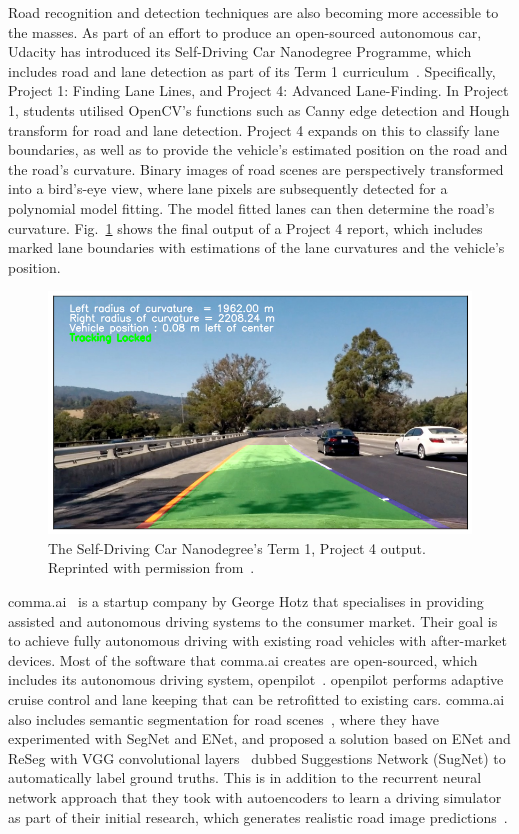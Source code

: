 Road recognition and detection techniques are also becoming more accessible to the masses. As part of an effort to produce an open-sourced autonomous car, Udacity has introduced its Self-Driving Car Nanodegree Programme, which includes road and lane detection as part of its Term 1 curriculum~\cite{udacity_self-driving_2017}. Specifically, Project 1: Finding Lane Lines, and Project 4: Advanced Lane-Finding. In Project 1, students utilised OpenCV's functions such as Canny edge detection and Hough transform for road and lane detection. Project 4 expands on this to classify lane boundaries, as well as to provide the vehicle's estimated position on the road and the road's curvature. Binary images of road scenes are perspectively transformed into a bird's-eye view, where lane pixels are subsequently detected for a polynomial model fitting. The model fitted lanes can then determine the road's curvature. Fig.~\ref{figudacity} shows the final output of a Project 4 report, which includes marked lane boundaries with estimations of the lane curvatures and the vehicle's position.

\begin{figure}[H]
	\centering
	\includegraphics[width=0.7\linewidth]{udacity}
	\caption[Self-Driving Car Nanodegree output]{The Self-Driving Car Nanodegree's Term 1, Project 4 output. Reprinted with permission from~\cite{anthony_github_2017}.}
	\label{figudacity}
\end{figure}

comma.ai~\cite{comma._ai_comma.ai_2017} is a startup company by George Hotz that specialises in providing assisted and autonomous driving systems to the consumer market. Their goal is to achieve fully autonomous driving with existing road vehicles with after-market devices. Most of the software that comma.ai creates are open-sourced, which includes its autonomous driving system, openpilot~\cite{comma._ai_openpilot_2017}. openpilot performs adaptive cruise control and lane keeping that can be retrofitted to existing cars. comma.ai also includes semantic segmentation for road scenes~\cite{comma.ai_self_2016}, where they have experimented with SegNet and ENet, and proposed a solution based on ENet and ReSeg with VGG convolutional layers~\cite{visin_reseg:_2016} dubbed Suggestions Network (SugNet) to automatically label ground truths. This is in addition to the recurrent neural network approach that they took with autoencoders to learn a driving simulator as part of their initial research, which generates realistic road image predictions~\cite{santana_learning_2016}. 

